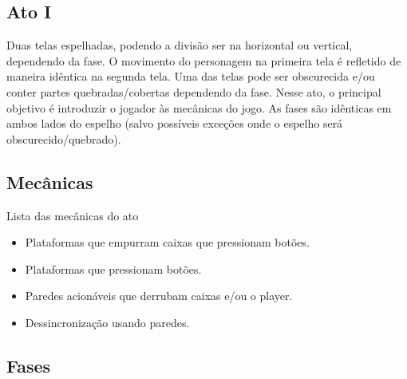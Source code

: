 \documentclass[a4paper, 11pt]{article}
\begin{document}
\begin{itemize}
\section{Ato I} 
 
	Duas telas espelhadas, podendo a divisão ser na horizontal ou vertical, dependendo da fase. O movimento do 
	personagem na primeira tela é refletido de maneira idêntica na segunda tela. Uma das telas pode ser obscurecida 
	e/ou conter partes quebradas/cobertas dependendo da fase. 
	Nesse ato, o principal objetivo é introduzir o jogador às mecânicas do jogo. As fases são idênticas 
	em ambos lados do espelho (salvo possíveis exceções onde o espelho será obscurecido/quebrado). 
 
\subsection{Mecânicas} 
 
	Lista das mecânicas do ato 
	\begin{itemize} 
		\item Plataformas que empurram caixas que pressionam botões. 
		\item Plataformas que pressionam botões.
		\item Paredes acionáveis que derrubam caixas e/ou o player.
		\item Dessincronização usando paredes.
	\end{itemize} 
 
\subsection{Fases} 
 

\end{itemize}
\end{document}
